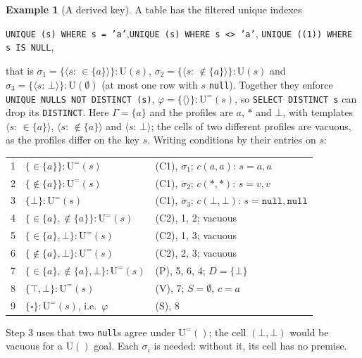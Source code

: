 \documentclass[conference]{IEEEtran}
\theoremstyle{definition}
\newtheorem{example}[theorem]{Example}
\newcommand{\sql}[1]{\texttt{#1}}
\newcommand{\nul}{\texttt{null}}
\newcommand{\U}[1]{\mathrm{U}(#1)}
\newcommand{\Ueq}[1]{\mathrm{U}^{=}(#1)}
\newcommand{\any}{\square}
\newcommand{\tpl}[1]{\ensuremath{\langle #1\rangle}}
\begin{document}
\begin{example}[A derived key]\label{ex:derivation}
A table has the filtered unique indexes
\begin{center}\small
\sql{UNIQUE (s) WHERE s = 'a'},\quad \sql{UNIQUE (s) WHERE s <> 'a'},\quad
\sql{UNIQUE ((1)) WHERE s IS NULL},
\end{center}
that is $\sigma_1=\{\tpl{s{:}\,{\in}\{a\}}\}:\U{s}$, $\sigma_2=\{\tpl{s{:}\,{\notin}\{a\}}\}:\U{s}$ and
$\sigma_3=\{\tpl{s{:}\,\bot}\}:\U{\emptyset}$ (at most one row with $s$ \nul). Together they
enforce \sql{UNIQUE NULLS NOT DISTINCT (s)}, $\varphi=\{\tpl{}\}:\Ueq{s}$, so \sql{SELECT DISTINCT s}
can drop its \sql{DISTINCT}. Here $\Gamma=\{a\}$ and the profiles are $a$, $*$ and $\bot$, with
templates $\tpl{s{:}\,{\in}\{a\}}$, $\tpl{s{:}\,{\notin}\{a\}}$ and $\tpl{s{:}\,\bot}$; the cells of
two different profiles are vacuous, as the profiles differ on the key $s$. Writing conditions
by their entries on $s$:
\begin{center}\small
\begin{tabular}{@{}r@{\ \ }l@{\ \ }l@{}}
1 & $\{{\in}\{a\}\}:\Ueq{s}$ & (C1), $\sigma_1$; $c(a,a)$: $s=a,a$\\
2 & $\{{\notin}\{a\}\}:\Ueq{s}$ & (C1), $\sigma_2$; $c(*,*)$: $s=v,v$\\
3 & $\{\bot\}:\Ueq{s}$ & (C1), $\sigma_3$; $c(\bot,\bot)$: $s=\nul,\nul$\\
4 & $\{{\in}\{a\},{\notin}\{a\}\}:\Ueq{s}$ & (C2), 1, 2; vacuous\\
5 & $\{{\in}\{a\},\bot\}:\Ueq{s}$ & (C2), 1, 3; vacuous\\
6 & $\{{\notin}\{a\},\bot\}:\Ueq{s}$ & (C2), 2, 3; vacuous\\
7 & $\{{\in}\{a\},{\notin}\{a\},\bot\}:\Ueq{s}$ & (P), 5, 6, 4; $D=\{\bot\}$\\
8 & $\{\top,\bot\}:\Ueq{s}$ & (V), 7; $S=\emptyset$, $c=a$\\
9 & $\{\any\}:\Ueq{s}$, i.e.\ $\varphi$ & (S), 8
\end{tabular}
\end{center}
Step 3 uses that two \nul s agree under $\Ueq{}$; the cell $(\bot,\bot)$ would be vacuous for a
$\U{}$ goal. Each $\sigma_i$ is needed: without it, its cell has no premise.
\end{example}
\end{document}
